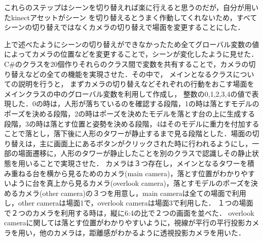 \documentclass[uplatex,titlepage]{jsarticle}
\begin{document}

これらのステップはシーンを切り替えれば楽に行えると思うのだが，自分が用いたkinectアセットがシーン
を切り替えるとうまく作動してくれないため，すべてシーンの切り替えではなくカメラの切り替えで場面を変更することにした．

上で述べたようにシーンの切り替えができなかったため全てグローバル変数の値によってカメラの位置などを変更することで，シーンが変化したように見せた．
C\#のクラスを20個作りそれらのクラス間で変数を共有することで，カメラの切り替えなどの全ての機能を実現させた．その中で，
メインとなるクラスについての説明を行うと，
まずカメラの切り替えなどそれぞれの行動をおこす場面をメインクラスの中のグローバル変数を利用して作成し，
整数の0,1,2,3,4の値で表現した．0の時は，人形が落ちているのを確認する段階，1の時は落とすモデルのポーズを決める段階，2の時はポーズを決めたモデルを落とす台の上に生成する段階，3の時は落とす位置と姿勢を決める段階，4はそのモデルに重力を付加することで落とし，落下後に人形のタワーが静止するまで見る段階とした．場面の切り替えは，主に画面上にあるボタンがクリックされた時に行われるようにし，一部の場面遷移に，人形のタワーが静止したことを別のクラスで認識しその静止状態を用いることで実現させた．
カメラは３つ存在し，メインとなるタワーを積み重ねる台を横から見るためのカメラ(main camera)，落とす位置がわかりやすいように台を真上から見るカメラ(overlook camera)，落とすモデルのポーズを決めるカメラ(other camera)の３つを用意し，main cameraは全ての場面で利用し，other cameraは場面1で，overlook cameraは場面3で利用した．
１つの場面で２つのカメラを利用する時は，縦に6:4の比で２つの画面を並べた．
overlook cameraに関しては落とす位置がわかりやすいように，視線が平行の平行投影カメラを用い，他のカメラは，距離感がわかるように透視投影カメラを用いた．
\end{document}
